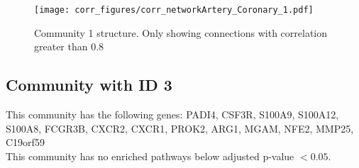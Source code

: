 \begin{figure}[h!]
\centering
\texttt{[image: corr\_figures/corr\_networkArtery\_Coronary\_1.pdf]}
\caption{Community 1 structure. Only showing connections with correlation greater than 0.8}
\end{figure}




\subsection*{Community with ID 3}
This community has the following genes: PADI4, CSF3R, S100A9, S100A12, S100A8, FCGR3B, CXCR2, CXCR1, PROK2, ARG1, MGAM, NFE2, MMP25, C19orf59
\\
This community has no enriched pathways below adjusted p-value $< 0.05$.


